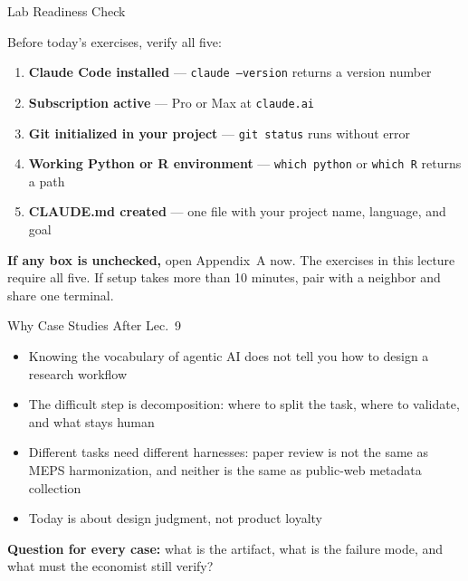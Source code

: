\documentclass[10pt,english,aspectratio=169]{beamer}
\begin{document}
\begin{frame}{Lab Readiness Check}

Before today's exercises, verify all five:

\vspace{0.2cm}

\begin{enumerate}
    \item \textbf{Claude Code installed} --- \texttt{claude --version} returns a version number

    \vspace{0.1cm}

    \item \textbf{Subscription active} --- Pro or Max at \texttt{claude.ai}

    \vspace{0.1cm}

    \item \textbf{Git initialized in your project} --- \texttt{git status} runs without error

    \vspace{0.1cm}

    \item \textbf{Working Python or R environment} --- \texttt{which python} or \texttt{which R} returns a path

    \vspace{0.1cm}

    \item \textbf{CLAUDE.md created} --- one file with your project name, language, and goal
\end{enumerate}

\vspace{0.3cm}

\textbf{If any box is unchecked,} open Appendix~A now. The exercises in this lecture require all five. If setup takes more than 10 minutes, pair with a neighbor and share one terminal.
\end{frame}

\begin{frame}{Why Case Studies After Lec.~9}
\begin{itemize}
    \item Knowing the vocabulary of agentic AI does not tell you how to design a research workflow
    \item The difficult step is decomposition: where to split the task, where to validate, and what stays human
    \item Different tasks need different harnesses:
    paper review is not the same as MEPS harmonization, and neither is the same as public-web metadata collection
    \item Today is about design judgment, not product loyalty
\end{itemize}

\vspace{0.35cm}
\textbf{Question for every case:} what is the artifact, what is the failure mode, and what must the economist still verify?
\end{frame}
\end{document}
